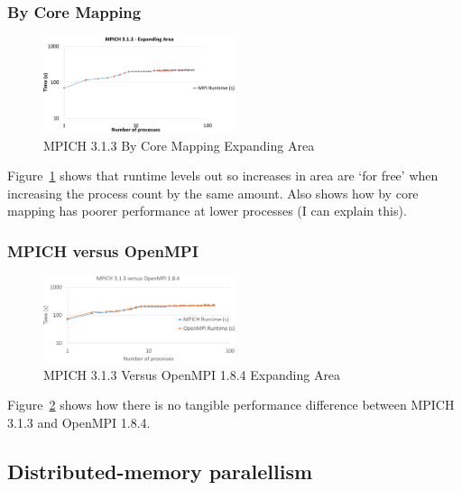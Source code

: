 \subsubsection{By Core Mapping}

\begin{figure}
    \includegraphics[page=1,width=0.5\textwidth]
    {graphs/MPICH313-by-core-mapping-expanding-area-crop.pdf}
    \caption{MPICH 3.1.3 By Core Mapping Expanding Area}
    \label{fig:mpichbycoremappingexpandingarea}
\end{figure}

Figure~\ref{fig:mpichbycoremappingexpandingarea} shows that runtime levels out
so increases in area are `for free' when increasing the process count by the
same amount. Also shows how by core mapping has poorer performance at lower
processes (I can explain this).

\subsubsection{MPICH versus OpenMPI}

\begin{figure}
    \includegraphics[page=1,width=0.5\textwidth]
    {graphs/MPICH313-versus-OpenMPI184-crop.pdf}
    \caption{MPICH 3.1.3 Versus OpenMPI 1.8.4 Expanding Area}
    \label{fig:mpichversusopenmpiexpandingarea}
\end{figure}

Figure~\ref{fig:mpichversusopenmpiexpandingarea} shows how there is no tangible
performance difference between MPICH 3.1.3 and OpenMPI 1.8.4.

\subsection{Distributed-memory paralellism}

